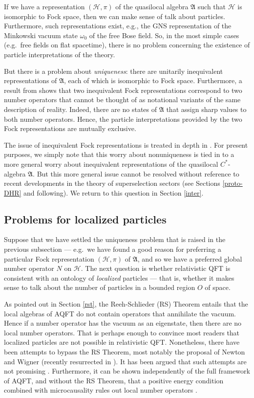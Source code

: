 \documentclass[12pt]{article}
\newcommand{\alg}[1]{\mathfrak{#1}}
\theoremstyle{definition}
\theoremstyle{definition}
\theoremstyle{remark}
\def\2#1{{\mathcal #1}}
\def\al#1{{\mathfrak #1}}
\def\om{\omega} \def\Om{\Omega} \def\dd{\partial} \def\D{\Delta}
\begin{document}
If we have a representation $(\2H ,\pi )$ of the quasilocal algebra
$\alg{A}$ such that $\2H$ is isomorphic to Fock space, then we can
make sense of talk about particles.  Furthermore, such representations
exist, e.g., the GNS representation of the Minkowski vacuum state $\om
_0$ of the free Bose field.  So, in the most simple cases (e.g.\ free
fields on flat spacetime), there is no problem concerning the
existence of particle interpretations of the theory.

But there is a problem about \emph{uniqueness}: there are unitarily
inequivalent representations of $\al A$, each of which is isomorphic
to Fock space.  Furthermore, a result from \cite{cha2,cha1} shows that
two inequivalent Fock representations correspond to two number
operators that cannot be thought of as notational variants of the same
description of reality.  Indeed, there are no states of $\al A$ that
assign sharp values to both number operators.  Hence, the particle
interpretations provided by the two Fock representations are mutually
exclusive.

The issue of inequivalent Fock representations is treated in depth in
\cite{rindler}.  For present purposes, we simply note that this worry
about nonuniqueness is tied in to a more general worry about
inequivalent representations of the quasilocal $C^*$-algebra
$\alg{A}$.  But this more general issue cannot be resolved without
reference to recent developments in the theory of superselection
sectors (see Sections \ref{proto-DHR} and following).  We return to
this question in Section \ref{inter}.

\subsection{Problems for localized particles}

Suppose that we have settled the uniqueness problem that is raised in
the previous subsection --- e.g.\ we have found a good reason for
preferring a particular Fock representation $(\2H, \pi )$ of $\al A$,
and so we have a preferred global number operator $N$ on $\2H$.  The
next question is whether relativistic QFT is consistent with an
ontology of \emph{localized} particles --- that is, whether it makes
sense to talk about the number of particles in a bounded region $O$ of
space.

As pointed out in Section \ref{rst}, the Reeh-Schlieder
(RS) Theorem entails that the local algebras of AQFT do
not contain operators that annihilate the vacuum.
Hence if a number operator has the vacuum as an
eigenstate, then there are no local number operators.
That is perhaps enough to convince most readers that
localized particles are not possible in relativistic
QFT.  Nonetheless, there have been attempts to bypass
the RS Theorem, most notably the proposal of Newton and
Wigner (recently resurrected in \cite{flem}).  It has
been argued that such attempts are not promising
\cite{me}.  Furthermore, it can be shown independently
of the full framework of AQFT, and without the RS
Theorem, that a positive energy condition combined with
microcausality rules out local number operators
\cite{noplace}.
\end{document}
